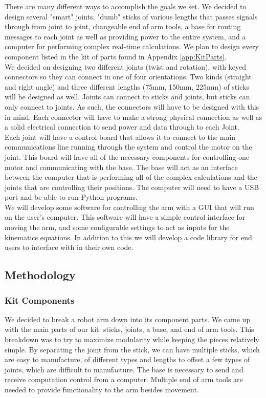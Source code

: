 There are many different ways to accomplish the goals we set. We decided to design several "smart" joints, "dumb" sticks of various lengths that passes signals through from joint to joint, changeable end of arm tools, a base for routing messages to each joint as well as providing power to the entire system, and a computer for performing complex real-time calculations. We plan to design every component listed in the kit of parts found in Appendix \ref{app:KitParts}. \\
\newline
We decided on designing two different joints (twist and rotation), with keyed connectors so they can connect in one of four orientations. Two kinds (straight and right angle) and three different lengths (75mm, 150mm, 225mm) of sticks will be designed as well. Joints can connect to sticks and joints, but sticks can only connect to joints. As such, the connectors will have to be designed with this in mind. Each connector will have to make a strong physical connection as well as a solid electrical connection to send power and data through to each Joint. \\
\newline
Each joint will have a control board that allows it to connect to the main communications line running through the system and control the motor on the joint. This board will have all of the necessary components for controlling one motor and communicating with the base. The base will act as an interface between the computer that is performing all of the complex calculations and the joints that are controlling their positions. The computer will need to have a USB port and be able to run Python programs.\\
\newline
We will develop some software for controlling the arm with a GUI that will run on the user's computer. This software will have a simple control interface for moving the arm, and some configurable settings to act as inputs for the kinematics equations. In addition to this we will develop a code library for end users to interface with in their own code.

\subsection{Methodology}
\subsubsection{Kit Components}
We decided to break a robot arm down into its component parts. We came up with the main parts of our kit: sticks, joints, a base, and end of arm tools. This breakdown was to try to maximize modularity while keeping the pieces relatively simple. By separating the joint from the stick, we can have multiple sticks, which are easy to manufacture, of different types and lengths to offset a few types of joints, which are difficult to manufacture. The base is necessary to send and receive computation control from a computer. Multiple end of arm tools are needed to provide functionality to the arm besides movement.

